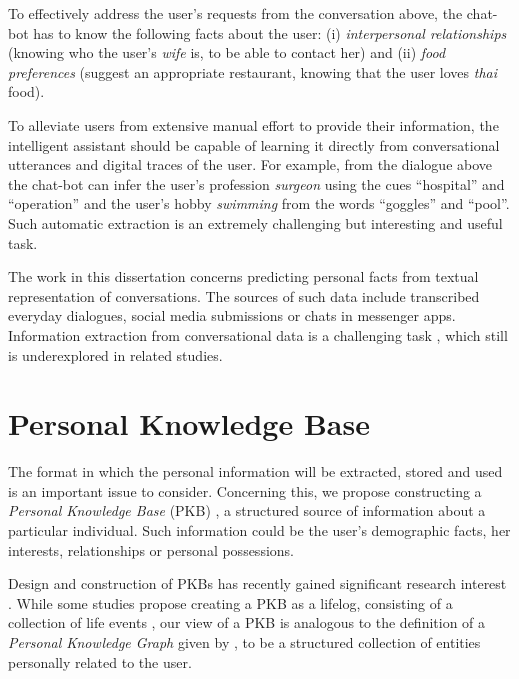To effectively address the user's requests from the conversation above, the chat-bot has to know the following facts about the user: (i) \textit{interpersonal relationships} (knowing who the user's \textit{wife} is, to be able to contact her) and (ii) \textit{food preferences} (suggest an appropriate restaurant, knowing that the user loves \textit{thai} food).

To alleviate users from extensive manual effort to provide their information, the intelligent assistant should be capable of learning it directly from conversational utterances and digital traces of the user. For example, from the dialogue above the chat-bot can infer the user's profession \textit{surgeon} using the cues ``hospital'' and ``operation'' and the user's hobby \textit{swimming} from the words ``goggles'' and ``pool''. Such automatic extraction is an extremely challenging but interesting and useful task.

The work in this dissertation concerns predicting personal facts from textual representation of conversations. The sources of such data include transcribed everyday dialogues, social media submissions or chats in messenger apps. Information extraction from conversational data is a challenging task \cite{wu2020getting, yen2019personal}, which still is underexplored in related studies. 

\section{Personal Knowledge Base}

The format in which the personal information will be extracted, stored and used is an important issue to consider. Concerning this, we propose constructing a \textit{Personal Knowledge Base} (PKB) \cite{balog2019personal, yen2019personal}, a structured source of information about a particular individual. Such information could be the user's demographic facts, her interests, relationships or personal possessions.%

Design and construction of PKBs has recently gained significant research interest \cite{vannur2020data, balog2019personal}. While some studies propose creating a PKB as a lifelog, consisting of a collection of life events \cite{yen2019personal, kao2021convlogminer}, our view of a PKB is analogous to the definition of a \textit{Personal Knowledge Graph} given by \citet{balog2019personal}, to be a structured collection of entities personally related to the user. 

